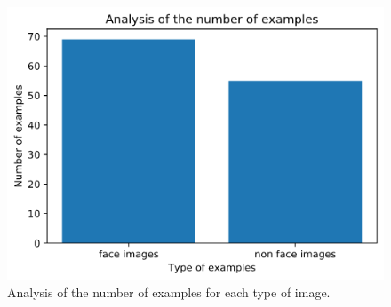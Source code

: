 \begin{figure}[htbp]
\centerline{\includegraphics[scale=0.35]{images/data_distribution.png}}
\caption{Analysis of the number of examples for each type of image.}
\label{fig:dataset-distribution}
\end{figure}